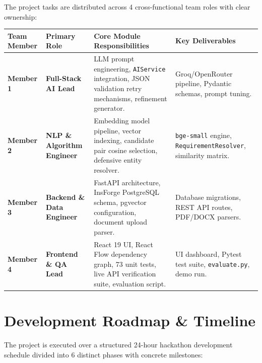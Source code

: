 \documentclass[11pt,a4paper]{article}
\begin{document}
The project tasks are distributed across 4 cross-functional team roles with clear ownership:

\noindent
\begin{tabularx}{\textwidth}{@{}l p{3.2cm} X p{3.2cm}@{}}
\toprule
\textbf{Team Member} & \textbf{Primary Role} & \textbf{Core Module Responsibilities} & \textbf{Key Deliverables} \\
\midrule
\textbf{Member 1} & \textbf{Full-Stack AI Lead} & LLM prompt engineering, \texttt{AIService} integration, JSON validation retry mechanisms, refinement generator. & Groq/OpenRouter pipeline, Pydantic schemas, prompt tuning. \\
\textbf{Member 2} & \textbf{NLP \& Algorithm Engineer} & Embedding model pipeline, vector indexing, candidate pair cosine selection, defensive entity resolver. & \texttt{bge-small} engine, \texttt{RequirementResolver}, similarity matrix. \\
\textbf{Member 3} & \textbf{Backend \& Data Engineer} & FastAPI architecture, InsForge PostgreSQL schema, pgvector configuration, document upload parser. & Database migrations, REST API routes, PDF/DOCX parsers. \\
\textbf{Member 4} & \textbf{Frontend \& QA Lead} & React 19 UI, React Flow dependency graph, 73 unit tests, live API verification suite, evaluation script. & UI dashboard, Pytest test suite, \texttt{evaluate.py}, demo run. \\
\bottomrule
\end{tabularx}

\section{Development Roadmap \& Timeline}

The project is executed over a structured 24-hour hackathon development schedule divided into 6 distinct phases with concrete milestones:
\end{document}
